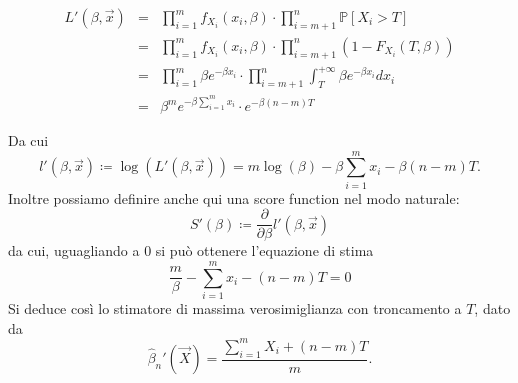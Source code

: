 \begin{enumerate}
\begin{eqnarray*}
L'(\beta,\vec{x}) &=&\prod_{i=1}^m f_{X_i}(x_i,\beta)\cdot\prod_{i=m+1}^n \mathbb{P}[X_i>T] \\
&=& \prod_{i=1}^m f_{X_i}(x_i,\beta)\cdot\prod_{i=m+1}^n \left(1-F_{X_i}(T,\beta)\right) \\
&=& \prod_{i=1}^m \beta e^{-\beta x_i} \cdot\prod_{i=m+1}^n \int_T^{+\infty} \beta e^{-\beta x_i}dx_i \\
&=& \beta^m e^{-\beta \sum_{i=1}^m x_i} \cdot e^{-\beta (n-m)T}
\end{eqnarray*}

Da cui $$l'(\beta,\vec{x})\coloneqq \log\left(L'(\beta,\vec{x})\right)=m\log(\beta)-\beta\sum_{i=1}^m x_i -\beta (n-m)T.$$ 
Inoltre possiamo definire anche qui una score function nel modo naturale: $$S'(\beta)\coloneqq \frac{\partial}{\partial\beta}l'(\beta,\vec{x})$$ da cui, uguagliando a 0 si può ottenere l'equazione di stima $$\frac{m}{\beta}-\sum_{i=1}^m x_i-(n-m)T=0$$ 
Si deduce così lo stimatore di massima verosimiglianza con troncamento a $T$, dato da $$\hat{\beta}_n'(\vec{X})=\frac{\sum_{i=1}^m X_i +(n-m)T}{m}.$$
\end{enumerate}

